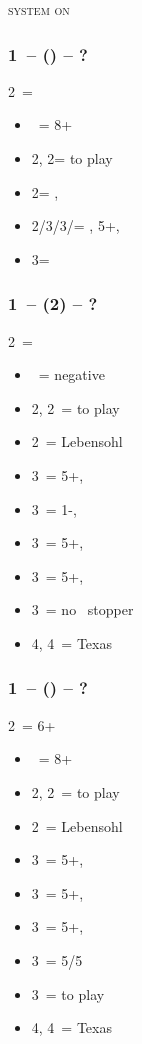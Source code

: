 \documentclass[12pt, a4paper]{report}
\begin{document}
\textsc{system on}

\subsubsection*{1\ntx\ -- (\alrts{2\clubs}) -- ?}
2\clubs\ = \major
\begin{itemize}
    \item \dbl\ = 8+
    \item 2\diams, 2\hearts = to play
    \item 2\spades = \minor, \invp
    \item 2\nt/3\clubs/3\diams/\3\hearts = \trsf{\clubs/\diams/\hearts/\spades}, 5+, \invp
    \item 3\spades = \gf
\end{itemize}

\subsubsection*{1\ntx\ -- (2\diams) -- ?}
2\diams\ = \diams
\begin{itemize}
    \item \dbl\ = negative
    \item 2\hearts, 2\spades\ = to play
    \item 2\nt\ = Lebensohl
    \item 3\clubs\ = 5+\hearts, \invp
    \item 3\diams\ = 1-\diams, \invp
    \item 3\hearts\ = 5+\spades, \invp
    \item 3\spades\ = 5+\clubs, \invp
    \item 3\nt\ = no \diams\ stopper
    \item 4\diams, 4\hearts\ = Texas
\end{itemize}

\subsubsection*{1\ntx\ -- (\alrts{2\diams}) -- ?}
2\diams\ = 6+ \major
\begin{itemize}
    \item \dbl\ = 8+
    \item 2\hearts, 2\spades\ = to play
    \item 2\nt\ = Lebensohl
    \item 3\clubs\ = 5+\diams, \invp
    \item 3\diams\ = 5+\hearts, \invp
    \item 3\hearts\ = 5+\spades, \invp
    \item 3\spades\ = 5/5 \minor
    \item 3\nt\ = to play
    \item 4\diams, 4\hearts\ = Texas
\end{itemize}
\end{document}
